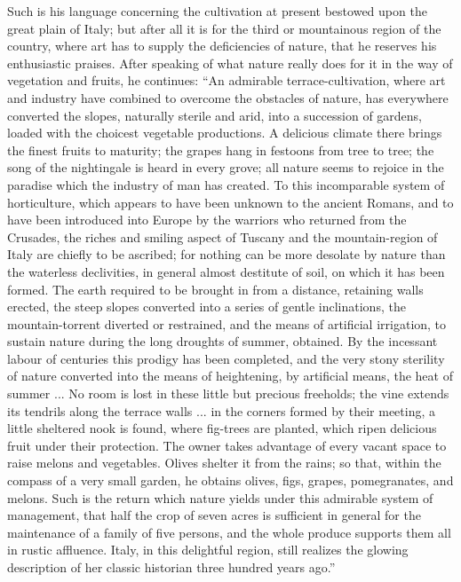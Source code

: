 Such is his language
concerning the cultivation at present bestowed upon the great plain of
Italy; but after all it is for the third or mountainous region of the
country, where art has to supply the deficiencies of nature, that he
reserves his enthusiastic praises. After speaking of what nature
really does for it in the way of vegetation and fruits, he continues: ``An
admirable terrace-cultivation, where art and industry have combined to
overcome the obstacles of nature, has everywhere converted the slopes,
naturally sterile and arid, into a succession of gardens, loaded with
the choicest vegetable productions. A delicious climate there brings
the finest fruits to maturity; the grapes hang in festoons from tree
to tree; the song of the nightingale is heard in every grove; all
nature seems to rejoice in the paradise which the industry of man has
created. To this incomparable system of horticulture, which appears to
have been unknown to the ancient Romans, and to have been
introduced into Europe by the warriors who returned from the Crusades,
the riches and smiling aspect of Tuscany and the mountain-region of
Italy are chiefly to be ascribed; for nothing can be more desolate by
nature than the waterless declivities, in general almost destitute of
soil, on which it has been formed. The earth required to be brought in
from a distance, retaining walls erected, the steep slopes converted
into a series of gentle inclinations, the mountain-torrent diverted or
restrained, and the means of artificial irrigation, to sustain nature
during the long droughts of summer, obtained. By the incessant labour
of centuries this prodigy has been completed, and the very stony
sterility of nature converted into the means of heightening, by
artificial means, the heat of summer ... No room is lost in these
little but precious freeholds; the vine extends its tendrils along the
terrace walls ... in the corners formed by their meeting, a little
sheltered nook is found, where fig-trees are planted, which ripen
delicious fruit under their protection. The owner takes advantage of
every vacant space to raise melons and vegetables. Olives shelter it
from the rains; so that, within the compass of a very small garden, he
obtains olives, figs, grapes, pomegranates, and melons. Such is the
return which nature yields under this admirable system of management,
that half the crop of seven acres is sufficient in general for the
maintenance of a family of five persons, and the whole produce
supports them all in rustic affluence. Italy, in this delightful
region, still realizes the glowing description of her classic
historian three hundred years ago.''

